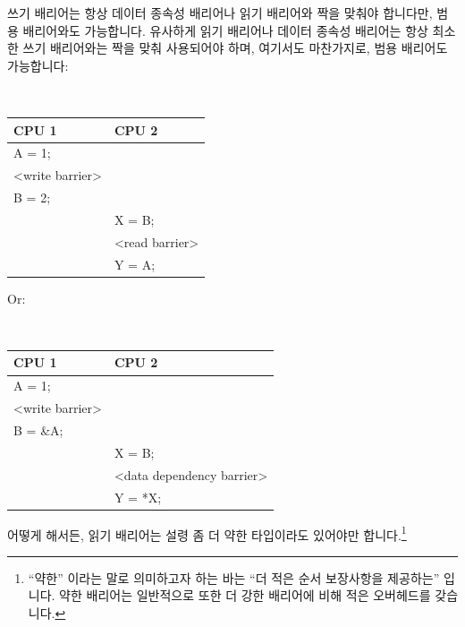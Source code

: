 \begin{enumerate}
쓰기 배리어는 항상 데이터 종속성 배리어나 읽기 배리어와 짝을 맞춰야 합니다만,
범용 배리어와도 가능합니다.
유사하게 읽기 배리어나 데이터 종속성 배리어는 항상 최소한 쓰기 배리어와는 짝을
맞춰 사용되어야 하며, 여기서도 마찬가지로, 범용 배리어도 가능합니다:

\vspace{5pt}
\begin{minipage}[t]{\columnwidth}
\tt
\scriptsize
\begin{tabular}{l|p{1.5in}}
	CPU 1 &		CPU 2 \\
	\hline
	A = 1; & \\
	<write barrier> & \\
	B = 2;	&	\\
		&	X = B; \\
		&	<read barrier> \\
		&	Y = A; \\
\end{tabular}
\end{minipage}
\vspace{5pt}

Or:

\vspace{5pt}
\begin{minipage}[t]{\columnwidth}
\tt
\scriptsize
\begin{tabular}{l|p{1.5in}}
	CPU 1 &		CPU 2 \\
	\hline
	A = 1; & \\
	<write barrier> & \\
	B = \&A; &	\\
		&	X = B; \\
		&	<data dependency barrier> \\
		&	Y = *X; \\
\end{tabular}
\end{minipage}
\vspace{5pt}

어떻게 해서든, 읽기 배리어는 설령 좀 더 약한 타입이라도 있어야만
합니다.\footnote{
	``약한'' 이라는 말로 의미하고자 하는 바는 ``더 적은 순서 보장사항을
	제공하는'' 입니다.
	약한 배리어는 일반적으로 또한 더 강한 배리어에 비해 적은 오버헤드를
	갖습니다.}


\end{enumerate}
